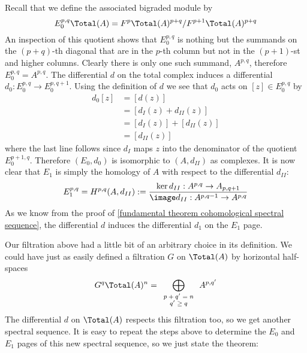 Recall that we define the associated bigraded module by
\[ E_0^{p,q} \Total(A) = F^p \Total(A)^{p+q} / F^{p+1} \Total(A)^{p+q} \]
An inspection of this quotient shows that $E_0^{p,q}$ is nothing but the summands on the $(p+q)$-th diagonal that are in the $p$-th column but not in the $(p+1)$-st and higher columns. Clearly there is only one such summand, $A^{p,q}$, therefore $E_0^{p,q} = A^{p,q}$. The differential $d$ on the total complex induces a differential $d_0 : E_0^{p,q} \rightarrow E_0^{p,q+1}$. Using the definition of $d$ we see that $d_0$ acts on $[z] \in E_0^{p,q}$ by
\begin{align*}
	d_0[z] &= [d(z)] \\
         &= [d_I(z) + d_{II}(z)] \\
         &= [d_I(z)] + [d_{II}(z)] \\
         &= [d_{II}(z)]
\end{align*}
where the last line follows since $d_I$ maps $z$ into the denominator of the quotient $E_0^{p+1,q}$. Therefore $(E_0,d_0)$ is isomorphic to $(A,d_{II})$ as complexes. It is now clear that $E_1$ is simply the homology of $A$ with respect to the differential $d_{II}$: 
\[ E_1^{p,q} = H^{p,q}(A,d_{II}) := \frac{ \ker d_{II} : A^{p,q} \rightarrow A_{p,q+1} }{ \image d_{II} : A^{p,q-1} \rightarrow A^{p,q} } \]
As we know from the proof of \ref{fundamental theorem cohomological spectral sequence}, the differential $d$ induces the differential $d_1$ on the $E_1$ page. 

\unfinished





Our filtration above had a little bit of an arbitrary choice in its definition. We could have just as easily defined a filtration $G$ on $\Total(A)$ by horizontal half-spaces
\[ G^q \Total(A)^n = \bigoplus_{\scriptsize \begin{array}{c} p+q'=n \\ q' \geq q \end{array} } A^{p,q'} \]
The differential $d$ on $\Total(A)$ respects this filtration too, so we get another spectral sequence. It is easy to repeat the steps above to determine the $E_0$ and $E_1$ pages of this new spectral sequence, so we just state the theorem:

